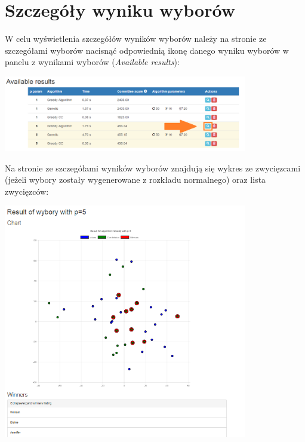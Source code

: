 \documentclass[pdflatex,11pt]{../aghdoc_version2}
\begin{document}
\section{Szczegóły wyniku wyborów}
\label{sec:szczegolywyniku}

W celu wyświetlenia szczegółów wyników wyborów należy na stronie ze szczegółami wyborów nacisnąć odpowiednią ikonę danego wyniku wyborów w panelu z wynikami wyborów (\textit{Available results}): \\

\begin{center}
\includegraphics[width=0.8\textwidth]{pics/result_details_button.png}
\end{center} 

\vspace{\baselineskip}
Na stronie ze szczegółami wyników wyborów znajdują się wykres ze zwycięzcami (jeżeli wybory zostały wygenerowane z rozkładu normalnego) oraz lista zwycięzców: \\
\begin{center}
\includegraphics[width=0.8\textwidth]{pics/result-details_version2.png}
\end{center} 
\newpage
\end{document}
